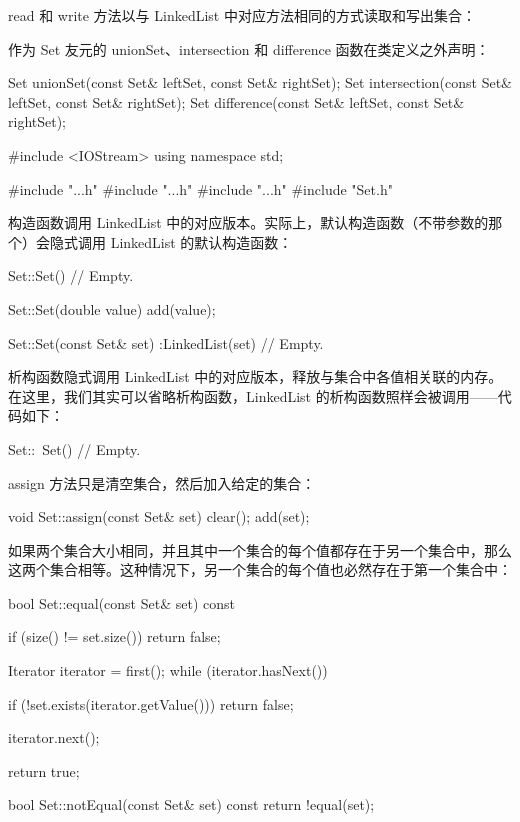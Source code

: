 read 和 write 方法以与 LinkedList 中对应方法相同的方式读取和写出集合：

\begin{codebox}
    void read(istream& inStream);
    void write(ostream& outStream);
};
\end{codebox}

作为 Set 友元的 unionSet、intersection 和 difference 函数在类定义之外声明：

\begin{codebox}
Set unionSet(const Set& leftSet, const Set& rightSet);
Set intersection(const Set& leftSet, const Set& rightSet);
Set difference(const Set& leftSet, const Set& rightSet);
\end{codebox}

\medskip{}

\begin{codebox}
#include <IOStream>
using namespace std;

#include "..\ListBasic\Cell.h"
#include "..\ListBasic\Iterator.h"
#include "..\ListBasic\List.h"
#include "Set.h"
\end{codebox}

构造函数调用 LinkedList 中的对应版本。实际上，默认构造函数（不带参数的那个）会隐式调用 LinkedList 的默认构造函数：

\begin{codebox}
Set::Set() {
  // Empty.
}

Set::Set(double value) {
  add(value);
}

Set::Set(const Set& set)
 :LinkedList(set) {
  // Empty.
}
\end{codebox}

析构函数隐式调用 LinkedList 中的对应版本，释放与集合中各值相关联的内存。在这里，我们其实可以省略析构函数，LinkedList 的析构函数照样会被调用——代码如下：

\begin{codebox}
Set::~Set() {
  // Empty.
}
\end{codebox}

assign 方法只是清空集合，然后加入给定的集合：

\begin{codebox}
void Set::assign(const Set& set) {
  clear();
  add(set);
}
\end{codebox}

如果两个集合大小相同，并且其中一个集合的每个值都存在于另一个集合中，那么这两个集合相等。这种情况下，另一个集合的每个值也必然存在于第一个集合中：

\begin{codebox}
bool Set::equal(const Set& set) const {
  if (size() != set.size()) {
    return false;
  }

  Iterator iterator = first();
  while (iterator.hasNext()) {
    if (!set.exists(iterator.getValue())) {
      return false;
    }

    iterator.next();
  }
  return true;
}

bool Set::notEqual(const Set& set) const {
  return !equal(set);
}
\end{codebox}


